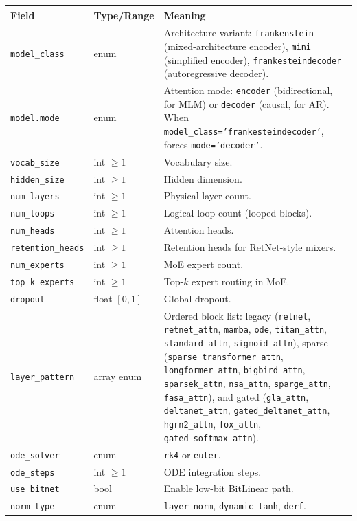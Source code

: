\documentclass[11pt,a4paper]{article}
\begin{document}
\small
\begin{longtable}{p{5.1cm}p{2.4cm}p{7.0cm}}
\toprule
\textbf{Field} & \textbf{Type/Range} & \textbf{Meaning} \\
\midrule
\endhead
\texttt{model\_class} & enum & Architecture variant: \texttt{frankenstein} (mixed-architecture encoder), \texttt{mini} (simplified encoder), \texttt{frankesteindecoder} (autoregressive decoder). \\
\texttt{model.mode} & enum & Attention mode: \texttt{encoder} (bidirectional, for MLM) or \texttt{decoder} (causal, for AR). When \texttt{model\_class='frankesteindecoder'}, forces \texttt{mode='decoder'}. \\
\texttt{vocab\_size} & int $\ge 1$ & Vocabulary size. \\
\texttt{hidden\_size} & int $\ge 1$ & Hidden dimension. \\
\texttt{num\_layers} & int $\ge 1$ & Physical layer count. \\
\texttt{num\_loops} & int $\ge 1$ & Logical loop count (looped blocks). \\
\texttt{num\_heads} & int $\ge 1$ & Attention heads. \\
\texttt{retention\_heads} & int $\ge 1$ & Retention heads for RetNet-style mixers. \\
\texttt{num\_experts} & int $\ge 1$ & MoE expert count. \\
\texttt{top\_k\_experts} & int $\ge 1$ & Top-$k$ expert routing in MoE. \\
\texttt{dropout} & float $[0,1]$ & Global dropout. \\
\texttt{layer\_pattern} & array enum & Ordered block list: legacy (\texttt{retnet}, \texttt{retnet\_attn}, \texttt{mamba}, \texttt{ode}, \texttt{titan\_attn}, \texttt{standard\_attn}, \texttt{sigmoid\_attn}), sparse (\texttt{sparse\_transformer\_attn}, \texttt{longformer\_attn}, \texttt{bigbird\_attn}, \texttt{sparsek\_attn}, \texttt{nsa\_attn}, \texttt{sparge\_attn}, \texttt{fasa\_attn}), and gated (\texttt{gla\_attn}, \texttt{deltanet\_attn}, \texttt{gated\_deltanet\_attn}, \texttt{hgrn2\_attn}, \texttt{fox\_attn}, \texttt{gated\_softmax\_attn}). \\
\texttt{ode\_solver} & enum & \texttt{rk4} or \texttt{euler}. \\
\texttt{ode\_steps} & int $\ge 1$ & ODE integration steps. \\
\texttt{use\_bitnet} & bool & Enable low-bit BitLinear path. \\
\texttt{norm\_type} & enum & \texttt{layer\_norm}, \texttt{dynamic\_tanh}, \texttt{derf}. \\

\end{longtable}
\end{document}
